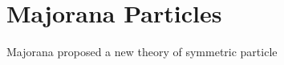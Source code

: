 \documentclass[a4paper]{article}
\author{Prakash Gautam}
\date{\today}
\begin{document}
    \section{Majorana Particles}
        Majorana proposed a new theory of symmetric particle\cite{bassani_symmetric_2006}
    
    
\end{document}
